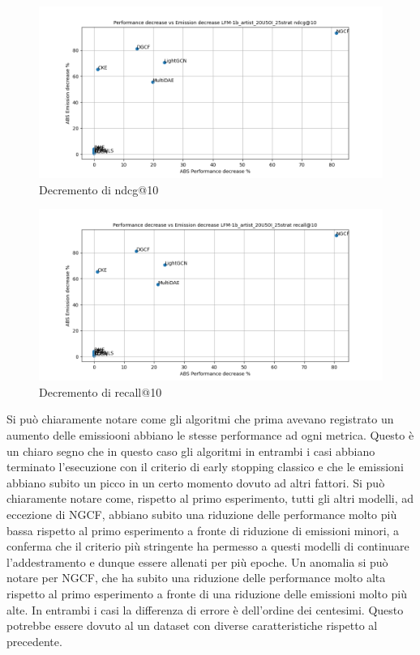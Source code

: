 \begin{figure}[H]
    \centering
    \includegraphics[scale=0.5]{images/decrement_ndcg@10_LFM-1b_artist_20U50I_25strat.png}
    \caption{Decremento di ndcg@10}
\end{figure}

\begin{figure}[H]
    \centering
    \includegraphics[scale=0.5]{images/decrement_recall@10_LFM-1b_artist_20U50I_25strat.png}
    \caption{Decremento di recall@10}
\end{figure}


\noindent Si può chiaramente notare come gli algoritmi che prima avevano registrato un aumento delle emissiooni abbiano le stesse performance ad ogni metrica.
Questo è un chiaro segno che in questo caso gli algoritmi in entrambi i casi abbiano terminato l'esecuzione con il criterio di early stopping classico e che le emissioni abbiano subito un picco in un certo momento dovuto ad altri fattori.
Si può chiaramente notare come, rispetto al primo esperimento, tutti gli altri modelli, ad eccezione di NGCF, abbiano subito una riduzione delle performance molto più bassa rispetto al primo esperimento a fronte di riduzione di emissioni minori, a conferma che il criterio più stringente ha permesso a questi modelli di continuare l'addestramento e dunque essere allenati per più epoche.
Un anomalia si può notare per NGCF, che ha subito una riduzione delle performance molto alta rispetto al primo esperimento a fronte di una riduzione delle emissioni molto più alte. In entrambi i casi la differenza di errore è dell'ordine dei centesimi. Questo potrebbe essere dovuto al un dataset con diverse caratteristiche rispetto al precedente.

